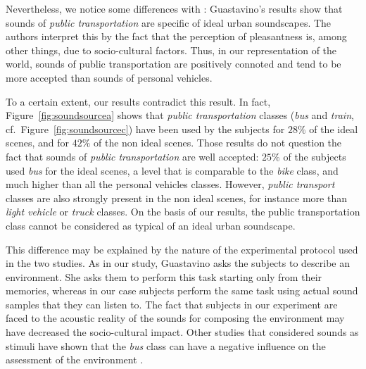 \documentclass[12pt]{elsarticle}
\newcommand{\cf}{cf.}
\begin{document}
Nevertheless, we notice some differences with \cite{guastavino2006ideal}: Guastavino’s results show that sounds of \emph{public transportation} are specific of ideal urban soundscapes. The authors interpret this by the fact that the perception of pleasantness is, among other things, due to socio-cultural factors. Thus, in our representation of the world, sounds of public transportation are positively connoted and tend to be more accepted than sounds of personal vehicles.

To a certain extent, our results contradict this result. In fact,  Figure~\ref{fig:soundsourcea} shows that \emph{public transportation} classes (\emph{bus} and \emph{train}, \cf~Figure~\ref{fig:soundsourcec}) have been used by the subjects for $28\%$ of the ideal scenes, and for $42\%$ of the non ideal scenes. Those results do not question the fact that sounds of \emph{public transportation} are well accepted: $25\%$ of the subjects used \emph{bus} for the ideal scenes, a level that is comparable to the \emph{bike} class, and much higher than all the personal vehicles classes. However, \emph{public transport} classes are also strongly present in the non ideal scenes, for instance more than \emph{light vehicle} or \emph{truck} classes. On the basis of our results, the public transportation class cannot be considered as typical of an ideal urban soundscape.


This difference may be explained by the nature of the experimental protocol used in the two studies. As in our study, Guastavino asks the subjects to describe an environment. She asks them to perform this task starting only from their memories, whereas in our case subjects perform the same task using actual sound samples that they can listen to. The fact that subjects in our experiment are faced to the acoustic reality of the sounds for composing the environment may have decreased the socio-cultural impact. Other studies that considered sounds as stimuli have shown that the \emph{bus} class can have a negative influence on the assessment of the environment \cite{lavandier2006contribution}.
\end{document}
